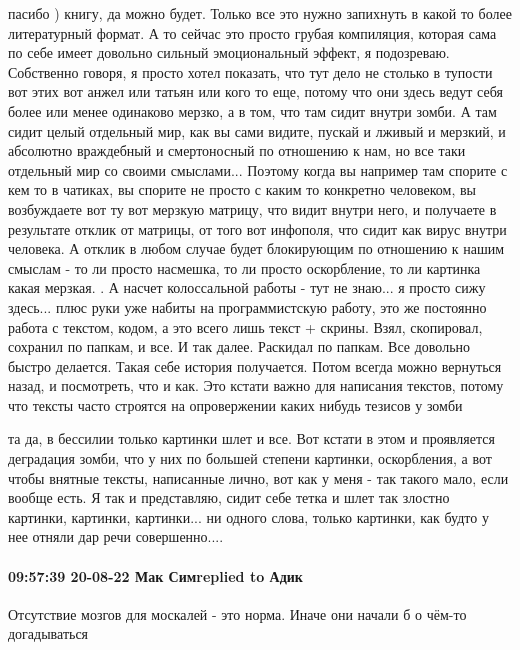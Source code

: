 пасибо ) книгу, да можно будет. Только все это нужно запихнуть в какой то более
литературный формат. А то сейчас это просто грубая компиляция, которая сама по
себе имеет довольно сильный эмоциональный эффект, я подозреваю. Собственно
говоря, я просто хотел показать, что тут дело не столько в тупости вот этих вот
анжел или татьян или кого то еще, потому что они здесь ведут себя более или
менее одинаково мерзко, а в том, что там сидит внутри зомби. А там сидит целый
отдельный мир, как вы сами видите, пускай и лживый и мерзкий, и абсолютно
враждебный и смертоносный по отношению к нам, но все таки отдельный мир со
своими смыслами... Поэтому когда вы например там спорите с кем то в чатиках, вы
спорите не просто с каким то конкретно человеком, вы возбуждаете вот ту вот
мерзкую матрицу, что видит внутри него, и получаете в результате отклик от
матрицы, от того вот инфополя, что сидит как вирус внутри человека. А отклик в
любом случае будет блокирующим по отношению к нашим смыслам - то ли просто
насмешка, то ли просто оскорбление, то ли картинка какая мерзкая. . А насчет
колоссальной работы - тут не знаю... я просто сижу здесь... плюс руки уже
набиты на программистскую работу, это же постоянно работа с текстом, кодом, а
это всего лишь текст + скрины. Взял, скопировал, сохранил по папкам, и все. И
так далее. Раскидал по папкам. Все довольно быстро делается. Такая себе история
получается. Потом всегда можно вернуться назад, и посмотреть, что и как. Это
кстати важно для написания текстов, потому что тексты часто строятся на
опровержении каких нибудь тезисов у зомби


та да, в бессилии только картинки шлет и все. Вот кстати в этом и проявляется
деградация зомби, что у них по большей степени картинки, оскорбления, а вот
чтобы внятные тексты, написанные лично, вот как у меня - так такого мало, если
вообще есть. Я так и представляю, сидит себе тетка и шлет так злостно картинки,
картинки, картинки... ни одного слова, только картинки, как будто у нее отняли
дар речи совершенно....

\paragraph{09:57:39 20-08-22 Мак Симreplied to Адик}

Отсутствие мозгов для москалей - это норма. Иначе они начали б о чём-то
догадываться

